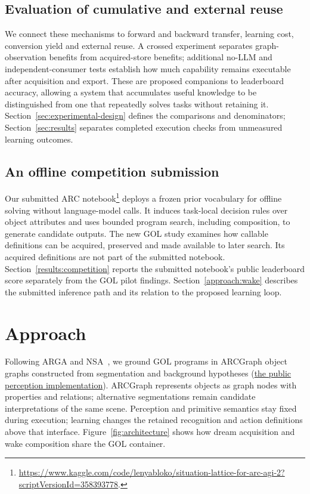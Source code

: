 \documentclass[11pt]{article}
\begin{document}
\subsection{Evaluation of cumulative and external reuse}
We connect these mechanisms to forward and backward transfer, learning cost, conversion yield and external reuse. A crossed experiment separates graph-observation benefits from acquired-store benefits; additional no-LLM and independent-consumer tests establish how much capability remains executable after acquisition and export. These are proposed companions to leaderboard accuracy, allowing a system that accumulates useful knowledge to be distinguished from one that repeatedly solves tasks without retaining it. Section~\ref{sec:experimental-design} defines the comparisons and denominators; Section~\ref{sec:results} separates completed execution checks from unmeasured learning outcomes.

\subsection{An offline competition submission}\label{contribution:submission}
Our submitted ARC notebook\footnote{\url{https://www.kaggle.com/code/lenyabloko/situation-lattice-for-arc-agi-2?scriptVersionId=358393778}.} deploys a frozen prior vocabulary for offline solving without language-model calls. It induces task-local decision rules over object attributes and uses bounded program search, including composition, to generate candidate outputs. The new GOL study examines how callable definitions can be acquired, preserved and made available to later search. Its acquired definitions are not part of the submitted notebook. Section~\ref{results:competition} reports the submitted notebook's public leaderboard score separately from the GOL pilot findings. Section~\ref{approach:wake} describes the submitted inference path and its relation to the proposed learning loop.

\section{Approach}\label{sec:approach}
Following ARGA and NSA~\cite{arga,nsa}, we ground GOL programs in ARCGraph object graphs constructed from segmentation and background hypotheses (\href{https://github.com/lenyabloko/arc-gol-paper-replay/blob/ddcdac9ab3f164c65f3f5ba626b2b9cf84d8f244/experiments/paper_gol_examples/offline_replay/runtime/gitlab/fullcheck/image.py}{the public perception implementation}). ARCGraph represents objects as graph nodes with properties and relations; alternative segmentations remain candidate interpretations of the same scene. Perception and primitive semantics stay fixed during execution; learning changes the retained recognition and action definitions above that interface. Figure~\ref{fig:architecture} shows how dream acquisition and wake composition share the GOL container.
\end{document}
